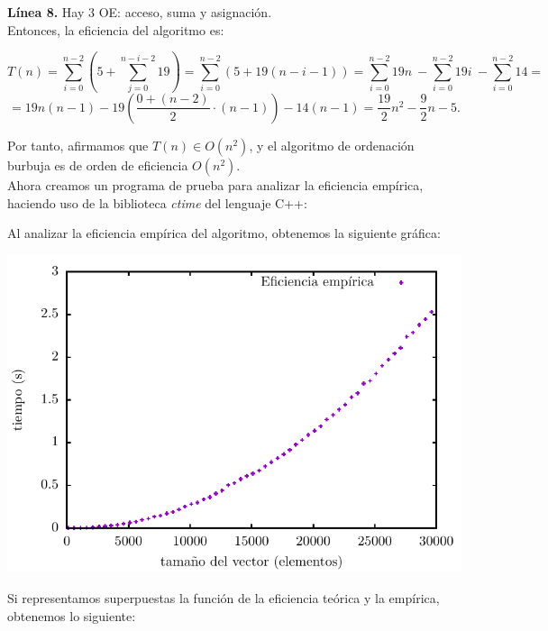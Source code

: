 \documentclass[11pt,a4paper]{article}
\begin{document}
\textbf{Línea 8.} Hay 3 OE: acceso, suma y asignación.\\

Entonces, la eficiencia del algoritmo es:

$$ T(n) = \sum_{i=0}^{n-2} \left( 5 + \sum_{j=0}^{n-i-2} 19 \right) = \sum_{i=0}^{n-2} \left( 5 + 19(n-i-1) \right) = \sum_{i=0}^{n-2} 19n\ - \sum_{i=0}^{n-2} 19i\ - \sum_{i=0}^{n-2} 14 = $$ $$ = 19n(n-1) - 19 \left( \frac{0 + (n-2)}{2} \cdot (n-1) \right) - 14(n-1) = \frac{19}{2}n^2 - \frac{9}{2} n - 5.$$

Por tanto, afirmamos que $T(n) \in O(n^2)$, y el algoritmo de ordenación burbuja es de orden de eficiencia $O(n^2)$.\\

Ahora creamos un programa de prueba para analizar la eficiencia empírica, haciendo uso de la biblioteca \emph{ctime} del lenguaje C++:



Al analizar la eficiencia empírica del algoritmo, obtenemos la siguiente gráfica:\\

\begin{center}
	\includegraphics{img/tiempos_burbuja.pdf}
\end{center}

Si representamos superpuestas la función de la eficiencia teórica y la empírica, obtenemos lo siguiente:\\
\end{document}
